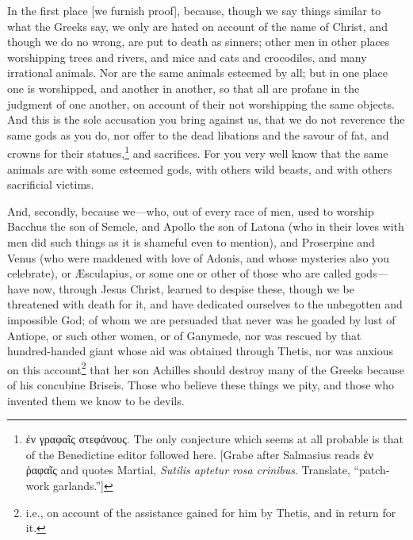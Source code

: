 
In the first place [we furnish proof], because, though we say things similar to what the Greeks say, we only are hated on account of the name of Christ, and though we do no wrong, are put to death as sinners; other men in other places worshipping trees and rivers, and mice and cats and crocodiles, and many irrational animals. Nor are the same animals esteemed by all; but in one place one is worshipped, and another in another, so that all are profane in the judgment of one another, on account of their not worshipping the same objects. And this is the sole accusation you bring against us, that we do not reverence the same gods as you do, nor offer to the dead libations and the savour of fat, and crowns for their statues,\footnote{\textgreek{ἐν γραφαῖς στεφάνους}. The only conjecture which seems at all probable is that of the Benedictine editor followed here. [Grabe after Salmasius reads \textgreek{ἐν ῥαφαῖς} and quotes Martial, \emph{Sutilis aptetur rosa crinibus}. Translate, “patch-work garlands.”]} and sacrifices. For you very well know that the same animals are with some esteemed gods, with others wild beasts, and with others sacrificial victims.


And, secondly, because we—who, out of every race of men, used to worship Bacchus the son of Semele, and Apollo the son of Latona (who in their loves with men did such things as it is shameful even to mention), and Proserpine and Venus (who were maddened with love of Adonis, and whose mysteries also you celebrate), or Æsculapius, or some one or other of those who are called gods—have now, through Jesus Christ, learned to despise these, though we be threatened with death for it, and have dedicated ourselves to the unbegotten and impossible God; of whom we are persuaded that never was he goaded by lust of Antiope, or such other women, or of Ganymede, nor was rescued by that hundred-handed giant whose aid was obtained through Thetis, nor was anxious on this account\footnote{i.e., on account of the assistance gained for him by Thetis, and in return for it.} that her son Achilles should destroy many of the Greeks because of his concubine Briseis. Those who believe these things we pity, and those who invented them we know to be devils.


